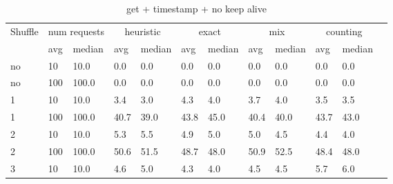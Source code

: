 \documentclass[12pt,a4paper]{report}
\begin{document}
\begin{table}[h]
	\centering
	\caption{get + timestamp + no keep alive}
	\label{tab:get_ts_nka}
	\begin{tabular}{|l|l|l|l|l|l|l|l|l|l|l|l|}
		\hline
		\multirow{2}{*}{Shuffle} & \multicolumn{2}{|c|}{num requests} & \multicolumn{2}{|c|}{heuristic} & \multicolumn{2}{|c|}{exact} & \multicolumn{2}{|c|}{mix} & \multicolumn{2}{|c|}{counting}                                          \\ \cline{2-11}
		                         & avg                                & median                          & avg                         & median                    & avg                            & median & avg  & median & avg  & median \\ \hline
		no                       & 10                                 & 10.0                            & 0.0                         & 0.0                       & 0.0                            & 0.0    & 0.0  & 0.0    & 0.0  & 0.0    \\ \hline
		no                       & 100                                & 100.0                           & 0.0                         & 0.0                       & 0.0                            & 0.0    & 0.0  & 0.0    & 0.0  & 0.0    \\ \hline
		1                        & 10                                 & 10.0                            & 3.4                         & 3.0                       & 4.3                            & 4.0    & 3.7  & 4.0    & 3.5  & 3.5    \\ \hline
		1                        & 100                                & 100.0                           & 40.7                        & 39.0                      & 43.8                           & 45.0   & 40.4 & 40.0   & 43.7 & 43.0   \\ \hline
		2                        & 10                                 & 10.0                            & 5.3                         & 5.5                       & 4.9                            & 5.0    & 5.0  & 4.5    & 4.4  & 4.0    \\ \hline
		2                        & 100                                & 100.0                           & 50.6                        & 51.5                      & 48.7                           & 48.0   & 50.9 & 52.5   & 48.4 & 48.0   \\ \hline
		3                        & 10                                 & 10.0                            & 4.6                         & 5.0                       & 4.3                            & 4.0    & 4.5  & 4.5    & 5.7  & 6.0    \\ \hline

\end{tabular}
\end{table}
\end{document}

